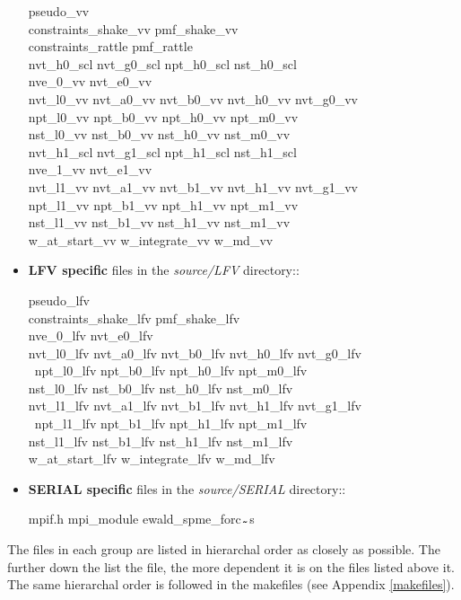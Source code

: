 \begin{itemize}
{\sc
pseudo\_vv \\
constraints\_shake\_vv pmf\_shake\_vv \\
constraints\_rattle pmf\_rattle \\
nvt\_h0\_scl nvt\_g0\_scl npt\_h0\_scl nst\_h0\_scl \\
nve\_0\_vv  nvt\_e0\_vv \\
nvt\_l0\_vv nvt\_a0\_vv nvt\_b0\_vv nvt\_h0\_vv nvt\_g0\_vv \\
npt\_l0\_vv npt\_b0\_vv npt\_h0\_vv npt\_m0\_vv \\
nst\_l0\_vv nst\_b0\_vv nst\_h0\_vv nst\_m0\_vv \\
nvt\_h1\_scl nvt\_g1\_scl npt\_h1\_scl nst\_h1\_scl \\
nve\_1\_vv  nvt\_e1\_vv \\
nvt\_l1\_vv nvt\_a1\_vv nvt\_b1\_vv nvt\_h1\_vv nvt\_g1\_vv \\
npt\_l1\_vv npt\_b1\_vv npt\_h1\_vv npt\_m1\_vv \\
nst\_l1\_vv nst\_b1\_vv nst\_h1\_vv nst\_m1\_vv \\
w\_at\_start\_vv w\_integrate\_vv  w\_md\_vv}

\item {\bf LFV specific} files in the {\em source/LFV} directory::

{\sc
pseudo\_lfv \\
constraints\_shake\_lfv pmf\_shake\_lfv \\
nve\_0\_lfv nvt\_e0\_lfv \\
nvt\_l0\_lfv nvt\_a0\_lfv nvt\_b0\_lfv nvt\_h0\_lfv nvt\_g0\_lfv \\\
npt\_l0\_lfv npt\_b0\_lfv npt\_h0\_lfv npt\_m0\_lfv \\
nst\_l0\_lfv nst\_b0\_lfv nst\_h0\_lfv nst\_m0\_lfv \\
nvt\_l1\_lfv nvt\_a1\_lfv nvt\_b1\_lfv nvt\_h1\_lfv nvt\_g1\_lfv \\\
npt\_l1\_lfv npt\_b1\_lfv npt\_h1\_lfv npt\_m1\_lfv \\
nst\_l1\_lfv nst\_b1\_lfv nst\_h1\_lfv nst\_m1\_lfv \\
w\_at\_start\_lfv w\_integrate\_lfv  w\_md\_lfv}

\item {\bf SERIAL specific} files in the {\em source/SERIAL} directory::

{\sc mpif.h mpi\_module ewald\_spme\_forc$_{\verb"~"}$s}

\end{itemize}
The files in each group are listed in hierarchal order as closely
as possible.  The further down the list the file, the more dependent
it is on the files listed above it.  The same hierarchal order is
followed in the makefiles (see Appendix \ref{makefiles}).


